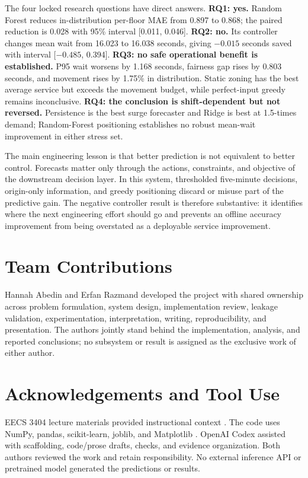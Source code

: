 \documentclass[12pt]{article}
\begin{document}
The four locked research questions have direct answers. \textbf{RQ1: yes.}
Random Forest reduces in-distribution per-floor MAE from 0.897 to 0.868; the
paired reduction is 0.028 with 95\% interval [0.011, 0.046]. \textbf{RQ2: no.}
Its controller changes mean wait from 16.023 to 16.038 seconds, giving
$-0.015$ seconds saved with interval [$-0.485$, 0.394]. \textbf{RQ3: no safe
operational benefit is established.} P95 wait worsens by 1.168 seconds,
fairness gap rises by 0.803 seconds, and movement rises by 1.75\% in
distribution. Static zoning has the best average service but exceeds the
movement budget, while perfect-input greedy remains inconclusive. \textbf{RQ4:
the conclusion is shift-dependent but not reversed.} Persistence is the best
surge forecaster and Ridge is best at 1.5-times demand; Random-Forest
positioning establishes no robust mean-wait improvement in either stress set.

The main engineering lesson is that better prediction is not equivalent to
better control. Forecasts matter only through the actions, constraints, and
objective of the downstream decision layer. In this system, thresholded
five-minute decisions, origin-only information, and greedy positioning discard
or misuse part of the predictive gain. The negative controller result is
therefore substantive: it identifies where the next engineering effort should
go and prevents an offline accuracy improvement from being overstated as a
deployable service improvement.

\section{Team Contributions}

Hannah Abedin and Erfan Razmand developed the project with shared ownership
across problem formulation, system design, implementation review, leakage
validation, experimentation, interpretation, writing, reproducibility, and
presentation. The authors jointly stand behind the implementation, analysis,
and reported conclusions; no subsystem or result is assigned as the exclusive
work of either author.

\section{Acknowledgements and Tool Use}

EECS 3404 lecture materials provided instructional context
\cite{eecs3404materials2026}. The code uses NumPy, pandas, scikit-learn, joblib,
and Matplotlib
\cite{harris2020numpy,mckinney2010pandas,pedregosa2011scikit,hunter2007matplotlib}.
OpenAI Codex assisted with scaffolding, code/prose drafts, checks, and evidence
organization. Both authors reviewed the work and retain responsibility. No
external inference API or pretrained model generated the predictions or results.

\clearpage


\end{document}
